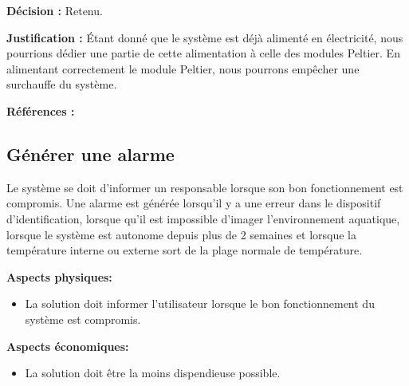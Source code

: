 \textbf{Décision :} Retenu.

\textbf{Justification :} Étant donné que le système est déjà alimenté en électricité, nous pourrions dédier une partie de cette alimentation à celle des modules Peltier. En alimentant correctement le module Peltier, nous pourrons empêcher une surchauffe du système.

\textbf{Références :} \cite{pel1} \cite{pel2}

\begin{table}[!htb]
\footnotesize
\centering
{}
\caption{Faisabilité des concepts pour réguler la température}
\label{t:Decision_réguler}
\end{table}


\subsection{Générer une alarme}
Le système se doit d'informer un responsable lorsque son bon fonctionnement est compromis. Une alarme est générée lorsqu'il y a une erreur dans le dispositif d'identification, lorsque qu'il est impossible d'imager l'environnement aquatique, lorsque le système est autonome depuis plus de 2 semaines et lorsque la température interne ou externe sort de la plage normale de température.  \vspace{5mm}


\textbf{Aspects physiques:}
\begin{itemize}[label = {--}]
    \item La solution doit informer l'utilisateur lorsque le bon fonctionnement du système est compromis.
\end{itemize}

\textbf{Aspects économiques:}
\begin{itemize}[label = {--}]
    \item La solution doit être la moins dispendieuse possible.
\end{itemize}

